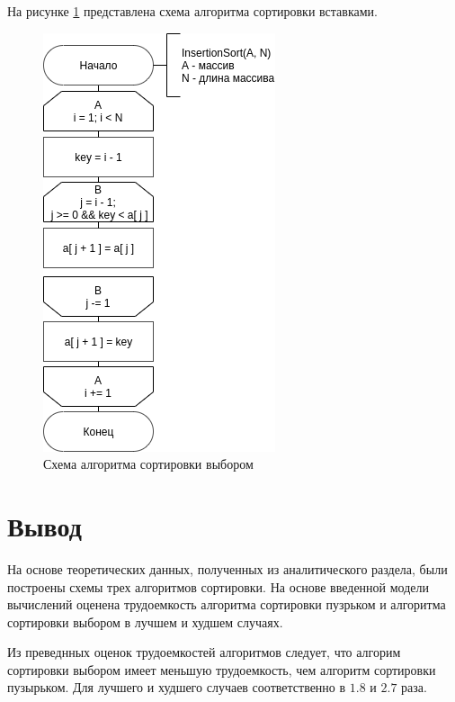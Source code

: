На рисунке \ref{scheme:insert} представлена схема алгоритма сортировки вставками.
\begin{figure}[!htb]
	\centering
	\includegraphics[scale=0.56]{schemes/insert}
	\caption{Схема алгоритма сортировки выбором}
	\label{scheme:insert}
\end{figure}

\section{Вывод}
На основе теоретических данных, полученных из аналитического раздела, 
были построены схемы трех алгоритмов сортировки. На основе введенной 
модели вычислений оценена трудоемкость алгоритма сортировки пузрьком 
и алгоритма сортировки выбором в луч­шем и худшем случаях.

Из преведнных оценок трудоемкостей алгоритмов следует, что алгорим 
сортировки выбором имеет меньшую трудоемкость, чем алгоритм сортировки
пузырьком. Для лучшего и худшего случаев соответственно в $1.8$ и $2.7$ раза.
